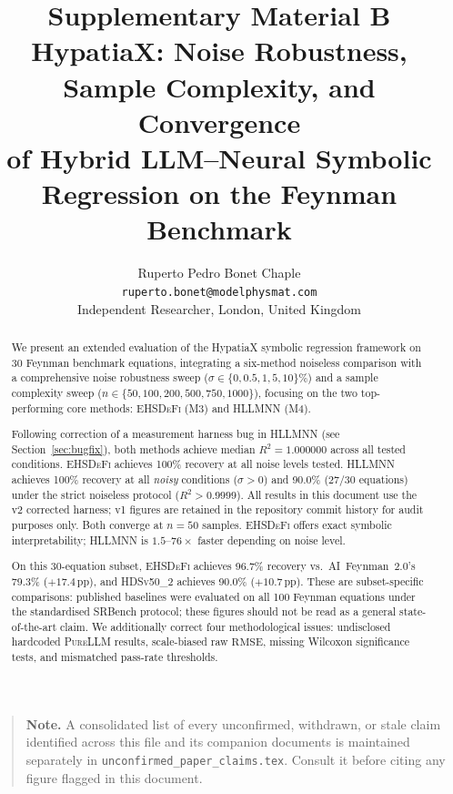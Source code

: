 \documentclass[twoside,11pt]{article}
\newcommand{\PureLLM}{\textsc{PureLLM}}
\newcommand{\EHD}{\textsc{EHSDeFi}}
\newcommand{\HSL}{\textsc{HLLMNN}}
\newcommand{\HDS}{\textsc{HDSv50\_2}}
\newcommand{\Rsq}{R^{2}}
\newcommand{\rmse}{\ensuremath{\mathrm{RMSE}}}
\begin{document}
\title{%
  Supplementary Material B\\[6pt]
  HypatiaX: Noise Robustness, Sample Complexity, and Convergence\\
  of Hybrid LLM--Neural Symbolic Regression on the Feynman Benchmark
}
\author{Ruperto Pedro Bonet Chaple\\
  \texttt{ruperto.bonet@modelphysmat.com}\\
  Independent Researcher, London, United Kingdom
}
\editor{}
\maketitle

\begin{abstract}
We present an extended evaluation of the HypatiaX symbolic regression
framework on 30 Feynman benchmark equations, integrating a six-method
noiseless comparison with a comprehensive noise robustness sweep
($\sigma \in \{0, 0.5, 1, 5, 10\}\%$) and a sample complexity sweep
($n \in \{50, 100, 200, 500, 750, 1000\}$), focusing on the two
top-performing core methods: \EHD{} (M3) and \HSL{} (M4).

Following correction of a measurement harness bug in \HSL{} (see
Section~\ref{sec:bugfix}), both methods achieve median $\Rsq = 1.000000$
across all tested conditions.
\EHD{} achieves 100\% recovery at all noise levels tested.
\HSL{} achieves 100\% recovery at all \emph{noisy} conditions ($\sigma > 0$)
and 90.0\% (27/30 equations) under the strict noiseless protocol ($\Rsq > 0.9999$).
All results in this document use the v2 corrected harness; v1 figures are
retained in the repository commit history for audit purposes only.
Both converge at $n = 50$ samples.
\EHD{} offers exact symbolic interpretability; \HSL{} is $1.5$--$76\times$
faster depending on noise level.

On this 30-equation subset, \EHD{} achieves 96.7\% recovery vs.\ AI~Feynman~2.0's
79.3\% ($+17.4$\,pp), and \HDS{} achieves 90.0\% ($+10.7$\,pp).
These are subset-specific comparisons: published baselines were evaluated on
all 100 Feynman equations under the standardised SRBench protocol; these
figures should not be read as a general state-of-the-art claim.
We additionally correct four methodological issues:
undisclosed hardcoded \PureLLM{} results, scale-biased raw \rmse,
missing Wilcoxon significance tests, and mismatched pass-rate thresholds.
\end{abstract}

\begin{quote}\small
\textbf{Note.} A consolidated list of every unconfirmed, withdrawn, or
stale claim identified across this file and its companion documents is
maintained separately in \texttt{unconfirmed\_paper\_claims.tex}. Consult
it before citing any figure flagged in this document.
\end{quote}
\end{document}
